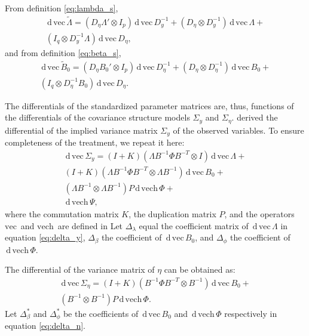 \documentclass[a4paper, 11pt]{article}
\newcommand{\n}{\eta}
\renewcommand{\l}{\lambda}
\renewcommand{\b}{\beta}
\newcommand{\p}{\phi}
\renewcommand{\d}{\,\mathrm{d}\,}
\newcommand{\kronprod}{\otimes}
\renewcommand{\vec}{\mathrm{vec}\,}
\newcommand{\vech}{\mathrm{vech}\,}
\newcommand{\Lambdastan}{\tilde{\Lambda}}
\newcommand{\Bstan}{\tilde{B}}
\newcommand{\0}{\boldsymbol{0}}
\begin{document}
From definition \ref{eq:lambda_s}, 
\begin{multline}\label{eq:dveclam}
\d\vec\Lambdastan = 
    (D_\n \Lambda' \kronprod I_p) \d \vec D_y^{-1} + 
    (D_\n \kronprod D_y^{-1}) \d\vec\Lambda + \\
    (I_q \kronprod D_y^{-1} \Lambda) \d\vec D_\n,
\end{multline}
and from definition \ref{eq:beta_s}, 
\begin{multline}\label{eq:dvecbeta}
\d\vec \Bstan_0 = 
    (D_\n B_0' \kronprod I_p) \d \vec D_\n^{-1} + 
    (D_\n \kronprod D_\n^{-1}) \d\vec B_0 + \\
    (I_q \kronprod D_\n^{-1} B_0) \d\vec D_\n.
\end{multline}

The differentials of the standardized parameter matrices are, thus, 
functions of the differentials of the covariance structure models $\Sigma_y$
and
$\Sigma_\n$.
\cite{neudecker1991linear} derived the differential of the implied variance
matrix $\Sigma_y$ of the observed variables. To ensure completeness of the treatment, we repeat it here:
\begin{equation}\label{eq:delta_y}
\begin{split}
\d\vec \Sigma_y = (I + K) (\Lambda B^{-1} \Phi B^{-T} \kronprod I) 
\d\vec\Lambda 
+ \\
(I + K) (\Lambda B^{-1} \Phi B^{-T} \kronprod \Lambda B^{-1}) \d\vec B_0
+ \\
(\Lambda B^{-1} \kronprod \Lambda B^{-1}) P \d \vech \Phi
+ \\
\d \vech \Psi,
\end{split}
\end{equation}
where the commutation matrix $K$, the duplication matrix $P$, and the operators
$\vec$ and $\vech$ are defined in \cite{magnus1988matrix}
Let $\Delta_\l$ equal the coefficient matrix
 of $\d\vec\Lambda$ in equation \ref{eq:delta_y}, 
$\Delta_\b$ the coefficient  of $\d\vec B_0$, and
$\Delta_\p$ the coefficient  of $\d\vech\Phi$.


The differential of the variance matrix of $\n$ can be obtained as:
\begin{equation}\label{eq:delta_n}
\begin{split}
\d\vec \Sigma_\n = 
(I + K) (B^{-1} \Phi B^{-T} \kronprod  B^{-1}) \d\vec B_0
+ \\
(B^{-1} \kronprod  B^{-1}) P \d \vech \Phi.
\end{split}
\end{equation}
Let $\Delta^*_\b$ and $\Delta^*_\p$  be the coefficients of $\d\vec B_0$ and
$\d\vech\Phi$ respectively in equation \ref{eq:delta_n}.
\end{document}
